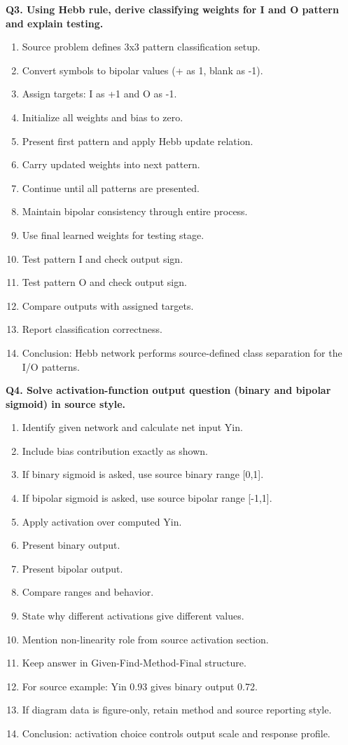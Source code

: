 \documentclass[11pt,a4paper]{article}
\begin{document}
\textbf{Q3. Using Hebb rule, derive classifying weights for I and O pattern and explain testing.}
\begin{enumerate}
\item Source problem defines 3x3 pattern classification setup.
\item Convert symbols to bipolar values (+ as 1, blank as -1).
\item Assign targets: I as +1 and O as -1.
\item Initialize all weights and bias to zero.
\item Present first pattern and apply Hebb update relation.
\item Carry updated weights into next pattern.
\item Continue until all patterns are presented.
\item Maintain bipolar consistency through entire process.
\item Use final learned weights for testing stage.
\item Test pattern I and check output sign.
\item Test pattern O and check output sign.
\item Compare outputs with assigned targets.
\item Report classification correctness.
\item Conclusion: Hebb network performs source-defined class separation for the I/O patterns.
\end{enumerate}

\textbf{Q4. Solve activation-function output question (binary and bipolar sigmoid) in source style.}
\begin{enumerate}
\item Identify given network and calculate net input Yin.
\item Include bias contribution exactly as shown.
\item If binary sigmoid is asked, use source binary range [0,1].
\item If bipolar sigmoid is asked, use source bipolar range [-1,1].
\item Apply activation over computed Yin.
\item Present binary output.
\item Present bipolar output.
\item Compare ranges and behavior.
\item State why different activations give different values.
\item Mention non-linearity role from source activation section.
\item Keep answer in Given-Find-Method-Final structure.
\item For source example: Yin 0.93 gives binary output 0.72.
\item If diagram data is figure-only, retain method and source reporting style.
\item Conclusion: activation choice controls output scale and response profile.
\end{enumerate}
\end{document}
